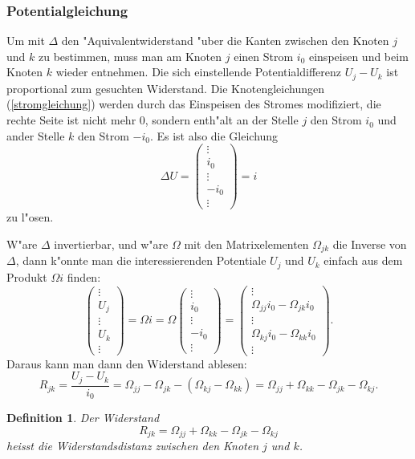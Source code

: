 \documentclass[a4paper,12pt]{article}
\begin{document}
\subsubsection{Potentialgleichung}
Um mit $\Delta$ den "Aquivalentwiderstand "uber die Kanten zwischen den
Knoten $j$ und $k$ zu bestimmen, muss man am Knoten $j$ einen
Strom $i_0$ einspeisen und beim Knoten $k$ wieder entnehmen.
Die sich einstellende Potentialdifferenz $U_j-U_k$ ist proportional
zum gesuchten Widerstand.
Die Knotengleichungen (\ref{stromgleichung}) werden durch das Einspeisen
des Stromes modifiziert, die rechte Seite ist nicht mehr $0$, sondern
enth"alt an der Stelle $j$ den Strom $i_0$ und ander Stelle $k$ den
Strom $-i_0$.
Es ist also die Gleichung
\begin{equation}
\Delta U=
\begin{pmatrix}\vdots\\i_0\\\vdots\\-i_0\\\vdots\end{pmatrix}
=i
\label{distanzgleichung}
\end{equation}
zu l"osen.

W"are $\Delta$ invertierbar, und w"are $\Omega$ mit den Matrixelementen
$\Omega_{jk}$ die Inverse von $\Delta$,
dann k"onnte man die interessierenden Potentiale $U_j$ und $U_k$
einfach aus dem Produkt $\Omega i$ finden:
\[
\begin{pmatrix}
\vdots\\
U_j\\
\vdots\\
U_k\\
\vdots
\end{pmatrix}
=
\Omega i
=
\Omega
\begin{pmatrix}\vdots\\i_0\\\vdots\\-i_0\\\vdots\end{pmatrix}
=
\begin{pmatrix}
\vdots\\
\Omega_{jj}i_0-\Omega_{jk}i_0\\
\vdots\\
\Omega_{kj}i_0-\Omega_{kk}i_0\\
\vdots
\end{pmatrix}.
\]
Daraus kann man dann den Widerstand ablesen:
\begin{equation}
R_{jk}
=
\frac{U_j-U_k}{i_0}
=
\Omega_{jj}-\Omega_{jk}
-(\Omega_{kj}-\Omega_{kk})
=
\Omega_{jj}
+\Omega_{kk}
-\Omega_{jk}
-\Omega_{kj}.
\label{widerstandsdistanz}
\end{equation}
\newtheorem{definition}{Definition}
\begin{definition}
Der Widerstand
\[
R_{jk}
=
\Omega_{jj}
+\Omega_{kk}
-\Omega_{jk}
-\Omega_{kj}
\]
heisst die {\em Widerstandsdistanz} zwischen den Knoten $j$ und $k$.
\end{definition}
\end{document}

